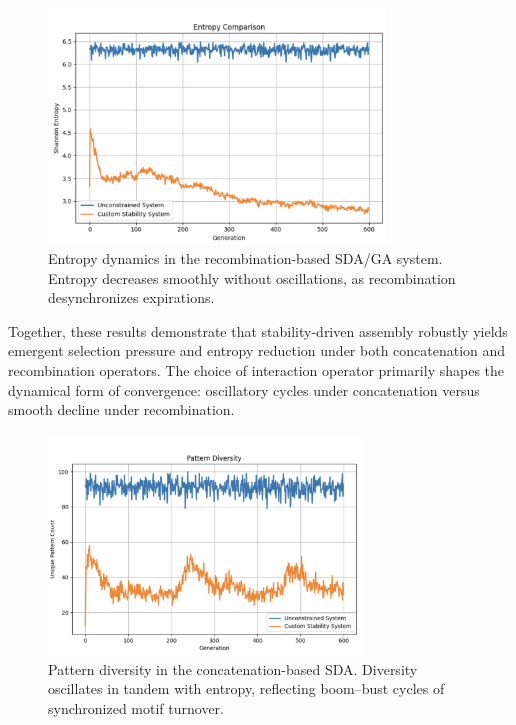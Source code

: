 \documentclass[life,article,submit,pdftex,moreauthors]{Definitions/mdpi}
\begin{document}
\begin{figure}[H]
    \centering
    \includegraphics[width=0.8\textwidth]{SDA-GA-entropy.png}
    \caption{Entropy dynamics in the recombination-based SDA/GA system. Entropy decreases smoothly without oscillations, as recombination desynchronizes expirations.}
    \label{fig:ga-entropy}
\end{figure}

Together, these results demonstrate that stability-driven assembly robustly yields emergent selection pressure and entropy reduction under both concatenation and recombination operators. The choice of interaction operator primarily shapes the dynamical form of convergence: oscillatory cycles under concatenation versus smooth decline under recombination.

\begin{figure}[H]
    \centering
    \includegraphics[width=0.75\textwidth]{SDA-concat-diversity.png}
    \caption{Pattern diversity in the concatenation-based SDA. Diversity oscillates in tandem with entropy, reflecting boom--bust cycles of synchronized motif turnover.}
    \label{fig:concat-diversity}
\end{figure}
\end{document}
